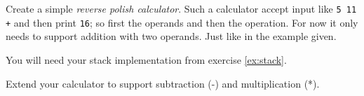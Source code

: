 \begin{Exercise}[title={Slice diff},difficulty=7]
\label{ex:slicediff}
\Question \label{ex:calc q1} Create a simple \emph{reverse polish calculator}. Such a calculator
accept input like \texttt{5 11 +} and then print \texttt{16}; so first the operands and then the
operation. For now it only needs to support addition with two operands. Just like in the
example given.

You will need your stack implementation from exercise \ref{ex:stack}.

\Question \label{ex:calc q2} Extend your calculator to support subtraction (-) and multiplication (*).
\end{Exercise}

\begin{Answer}

\Question

\Question

\end{Answer}
